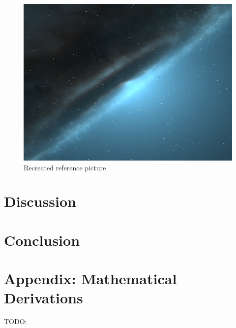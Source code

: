 \documentclass[reprint,english,notitlepage]{revtex4-2}
\begin{document}
\begin{figure}[h!]
	\centering
	\includegraphics[scale = .2]{Figures/sample0000.png}
	\caption{Recreated reference picture}
	\label{fig: ref picture}
  \end{figure}
  

\section{Discussion} \label{sec:discussion}



\section{Conclusion} \label{sec:conclusion}



\section{Appendix: Mathematical Derivations}


\newpage
\newpage
TODO: %
\end{document}
